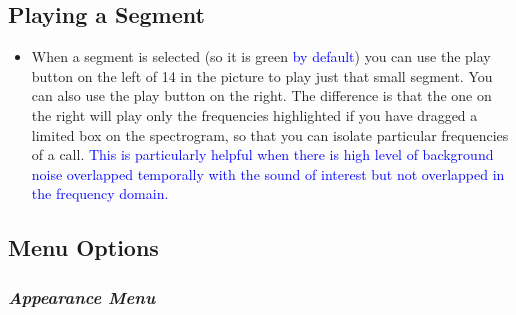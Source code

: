 \documentclass{article}
\begin{document}
\subsection{Playing a Segment}

\begin{itemize}
\item When a segment is selected (so it is green \textcolor{blue}{by default}) you can use the play button on the left of 14 in the picture to play just that small segment. You can also use the play button on the right. The difference is that the one on the right will play only the frequencies highlighted if you have dragged a limited box on the spectrogram, so that you can isolate particular frequencies of a call. \textcolor{blue}{This is particularly helpful when there is high level of background noise overlapped temporally with the sound of interest but not overlapped in the frequency domain.} 
\end{itemize}

\subsection{Menu Options}	

\subsubsection{{\em Appearance Menu}}
\end{document}
